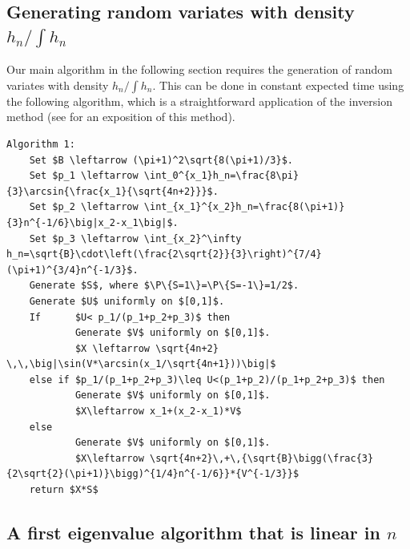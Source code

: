\documentclass[10pt]{article}
\theoremstyle{definition}
\theoremstyle{remark}
\renewcommand{\P}{\mathbb{P}}
\newcommand{\1}{\mathbbm{1}}
\newcommand{\0}{\mathbbm{0}}
\renewcommand{\mathbb}{\mathbf}
\begin{document}
\subsection{Generating random variates with density $h_n/\int h_n$} \label{bonangen}


Our main algorithm in the following section requires the generation of random variates with density $h_n/\int h_n$. This can be done in constant expected time using the following algorithm, which is a straightforward application of the inversion method (see \cite{rng} for an exposition of this method). 

\begin{lstlisting}
Algorithm 1:
    Set $B \leftarrow (\pi+1)^2\sqrt{8(\pi+1)/3}$.
    Set $p_1 \leftarrow \int_0^{x_1}h_n=\frac{8\pi}{3}\arcsin{\frac{x_1}{\sqrt{4n+2}}}$.
    Set $p_2 \leftarrow \int_{x_1}^{x_2}h_n=\frac{8(\pi+1)}{3}n^{-1/6}\big|x_2-x_1\big|$.
    Set $p_3 \leftarrow \int_{x_2}^\infty h_n=\sqrt{B}\cdot\left(\frac{2\sqrt{2}}{3}\right)^{7/4}(\pi+1)^{3/4}n^{-1/3}$.
    Generate $S$, where $\P\{S=1\}=\P\{S=-1\}=1/2$.
    Generate $U$ uniformly on $[0,1]$.
    If      $U< p_1/(p_1+p_2+p_3)$ then 
            Generate $V$ uniformly on $[0,1]$.
            $X \leftarrow \sqrt{4n+2} \,\,\big|\sin(V*\arcsin(x_1/\sqrt{4n+1}))\big|$
    else if $p_1/(p_1+p_2+p_3)\leq U<(p_1+p_2)/(p_1+p_2+p_3)$ then
            Generate $V$ uniformly on $[0,1]$.
            $X\leftarrow x_1+(x_2-x_1)*V$
    else 
            Generate $V$ uniformly on $[0,1]$.
            $X\leftarrow \sqrt{4n+2}\,+\,{\sqrt{B}\bigg(\frac{3}{2\sqrt{2}(\pi+1)}\bigg)^{1/4}n^{-1/6}}*{V^{-1/3}}$
    return $X*S$
\end{lstlisting}




\subsection{A first eigenvalue algorithm that is linear in $n$}\label{bonanalg}
\end{document}
